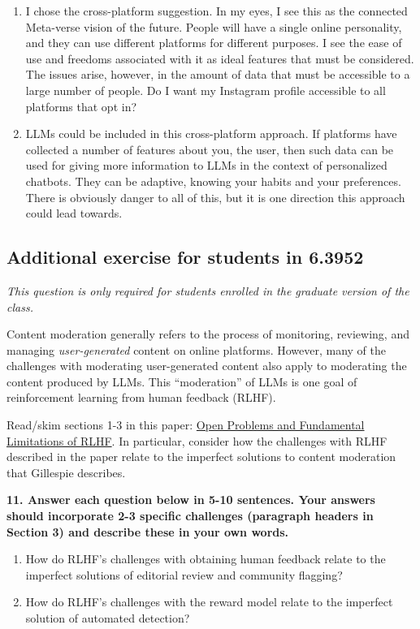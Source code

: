 \documentclass{article}
\begin{document}
\begin{mdframed}
\begin{enumerate}[label=\Alph*.]
    \item I chose the cross-platform suggestion. In my eyes, I see this as the connected Meta-verse vision of the future. People will have a single online personality, and they can use different platforms for different purposes. I see the ease of use and freedoms associated with it as ideal features that must be considered. The issues arise, however, in the amount of data that must be accessible to a large number of people. Do I want my Instagram profile accessible to all platforms that opt in? 
    \item LLMs could be included in this cross-platform approach. If platforms have collected a number of features about you, the user, then such data can be used for giving more information to LLMs in the context of personalized chatbots. They can be adaptive, knowing your habits and your preferences. There is obviously danger to all of this, but it is one direction this approach could lead towards. 
\end{enumerate}
\end{mdframed}
\bigskip



\clearpage 

\subsection*{Additional exercise for students in 6.3952}

\textit{This question is only required for students enrolled in the graduate version of the class.}

Content moderation generally refers to the process of monitoring, reviewing, and managing \textit{user-generated} content on online platforms. However, many of the challenges with moderating user-generated content also apply to moderating the content produced by LLMs. This ``moderation'' of LLMs is one goal of reinforcement learning from human feedback (RLHF). 

Read/skim sections 1-3 in this paper: \href{https://arxiv.org/pdf/2307.15217}{Open Problems and Fundamental Limitations of RLHF}. In particular, consider how the challenges with RLHF described in the paper relate to the imperfect solutions to content moderation that Gillespie describes. 

\textbf{11. Answer each question below in 5-10 sentences. Your answers should incorporate 2-3 specific challenges (paragraph headers in Section 3) and describe these in your own words.} 
\begin{enumerate}[label=\Alph*.]
    \item How do RLHF's challenges with obtaining human feedback relate to the imperfect solutions of editorial review and community flagging?
    \item How do RLHF's challenges with the reward model relate to the imperfect solution of automated detection? 
\end{enumerate}
\end{document}
